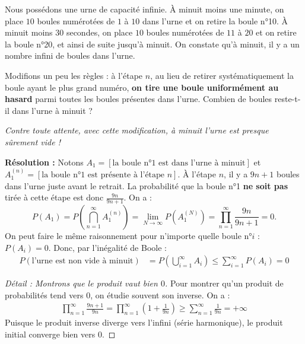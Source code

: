 \begin{exercice}
    Nous possédons une urne de capacité infinie. À minuit moins une minute, on place $10$ boules numérotées de $1$ à $10$ dans l'urne et on retire la boule n°10. À minuit moins 30 secondes, on place $10$ boules numérotées de $11$ à $20$ et on retire la boule n°20, et ainsi de suite jusqu'à minuit. On constate qu'à minuit, il y a un nombre infini de boules dans l'urne. 
    
    Modifions un peu les règles : à l'étape $n$, au lieu de retirer systématiquement la boule ayant le plus grand numéro, \textbf{on tire une boule uniformément au hasard} parmi toutes les boules présentes dans l'urne. Combien de boules reste-t-il dans l'urne à minuit ?
    
    \textit{Contre toute attente, avec cette modification, à minuit l'urne est presque sûrement vide !}
    
    \medskip\noindent \textbf{Résolution :} 
    Notons $A_1=[\text{la boule n°1 est dans l'urne à minuit}]$ et $A_1^{(n)}= [\text{la boule n°1 est présente à l'étape } n]$.
    À l'étape $n$, il y a $9n+1$ boules dans l'urne juste avant le retrait. La probabilité que la boule n°1 \textbf{ne soit pas} tirée à cette étape est donc $\frac{9n}{9n+1}$.
    On a :
    \[
    P(A_1) = P\left(\bigcap_{n=1}^\infty A_1^{(n)}\right) = \lim_{N\to\infty} P\left(A^{(N)}_1\right) = \prod_{n = 1}^\infty \frac{9n}{9n+1} = 0.
    \]
    On peut faire le même raisonnement pour n'importe quelle boule n°$i$ : $P(A_i) = 0$. Donc, par l'inégalité de Boole :
    \begin{align*}
        P(\text{l'urne est non vide à minuit}) &= P\left(\bigcup_{i = 1}^\infty A_i\right) \le \sum_{i = 1}^\infty P(A_i) = 0
    \end{align*}
\end{exercice}

\begin{proof}[Détail : Montrons que le produit vaut bien $0$]
    Pour montrer qu'un produit de probabilités tend vers $0$, on étudie souvent son inverse. On a :
    \begin{align*}
        \prod_{n = 1}^\infty \frac{9n + 1}{9n} = \prod_{n = 1}^\infty \left(1 + \frac{1}{9n}\right) \ge \sum_{n = 1}^\infty \frac{1}{9n} = +\infty  
    \end{align*}
    Puisque le produit inverse diverge vers l'infini (série harmonique), le produit initial converge bien vers $0$.
\end{proof}

